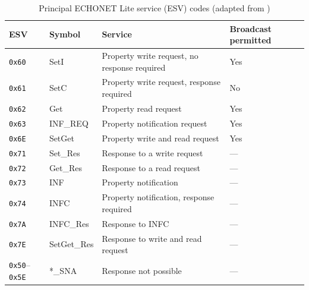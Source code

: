 \begin{table}[htbp]
  \centering
  \caption{Principal ECHONET Lite service (ESV) codes (adapted from \cite{ECHONETPart2})}
  \label{tab:esv}
  \renewcommand{\arraystretch}{1.2}
  \begin{tabularx}{\textwidth}{@{}l l X l@{}}
    \toprule
    \textbf{ESV}                 & \textbf{Symbol} & \textbf{Service}                             & \textbf{Broadcast permitted} \\
    \midrule
    \texttt{0x60}                & SetI            & Property write request, no response required & Yes                          \\
    \texttt{0x61}                & SetC            & Property write request, response required    & No                           \\
    \texttt{0x62}                & Get             & Property read request                        & Yes                          \\
    \texttt{0x63}                & INF\_REQ        & Property notification request                & Yes                          \\
    \texttt{0x6E}                & SetGet          & Property write and read request              & Yes                          \\
    \texttt{0x71}                & Set\_Res        & Response to a write request                  & ---                          \\
    \texttt{0x72}                & Get\_Res        & Response to a read request                   & ---                          \\
    \texttt{0x73}                & INF             & Property notification                        & ---                          \\
    \texttt{0x74}                & INFC            & Property notification, response required     & ---                          \\
    \texttt{0x7A}                & INFC\_Res       & Response to INFC                             & ---                          \\
    \texttt{0x7E}                & SetGet\_Res     & Response to write and read request           & ---                          \\
    \texttt{0x50}--\texttt{0x5E} & *\_SNA          & Response not possible                        & ---                          \\
    \bottomrule
  \end{tabularx}
\end{table}

